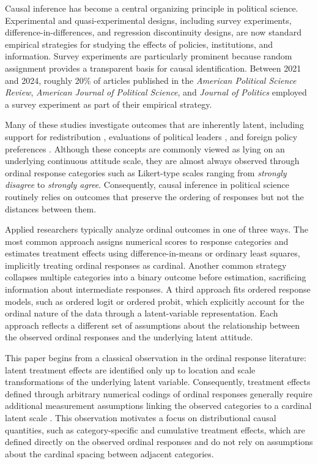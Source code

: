 \documentclass{article}
\begin{document}
Causal inference has become a central organizing principle in political science. Experimental and quasi-experimental designs, including survey experiments, difference-in-differences, and regression discontinuity designs, are now standard empirical strategies for studying the effects of policies, institutions, and information. Survey experiments are particularly prominent because random assignment provides a transparent basis for causal identification. Between 2021 and 2024, roughly 20\% of articles published in the \textit{American Political Science Review}, \textit{American Journal of Political Science}, and \textit{Journal of Politics} employed a survey experiment as part of their empirical strategy.

Many of these studies investigate outcomes that are inherently latent, including support for redistribution \citep{Alt2017a, Magni2021a}, evaluations of political leaders \citep{Canes-Wrone2002a, Kriner2009a}, and foreign policy preferences \citep{Tomz2020a}. Although these concepts are commonly viewed as lying on an underlying continuous attitude scale, they are almost always observed through ordinal response categories such as Likert-type scales ranging from \textit{strongly disagree} to \textit{strongly agree}. Consequently, causal inference in political science routinely relies on outcomes that preserve the ordering of responses but not the distances between them.

Applied researchers typically analyze ordinal outcomes in one of three ways. The most common approach assigns numerical scores to response categories and estimates treatment effects using difference-in-means or ordinary least squares, implicitly treating ordinal responses as cardinal. Another common strategy collapses multiple categories into a binary outcome before estimation, sacrificing information about intermediate responses. A third approach fits ordered response models, such as ordered logit or ordered probit, which explicitly account for the ordinal nature of the data through a latent-variable representation. Each approach reflects a different set of assumptions about the relationship between the observed ordinal responses and the underlying latent attitude.

This paper begins from a classical observation in the ordinal response literature: latent treatment effects are identified only up to location and scale transformations of the underlying latent variable. Consequently, treatment effects defined through arbitrary numerical codings of ordinal responses generally require additional measurement assumptions linking the observed categories to a cardinal latent scale \citep{Schroder2017a, Bond2018a, Bloem2022a}. This observation motivates a focus on distributional causal quantities, such as category-specific and cumulative treatment effects, which are defined directly on the observed ordinal responses and do not rely on assumptions about the cardinal spacing between adjacent categories.
\end{document}
